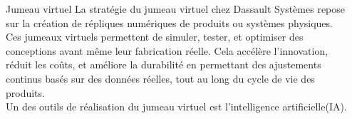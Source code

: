 \documentclass{ENSEIRB_poster}
\begin{document}
\begin{frame}[t]
\begin{columns}[t]
\begin{column}{\twocolwidth}
      \vspace{5pt}

      \begin{block}{Jumeau virtuel}
        La stratégie du jumeau virtuel chez Dassault Systèmes repose sur la création de répliques numériques de produits ou systèmes physiques. Ces jumeaux virtuels permettent de simuler, tester, et optimiser des conceptions avant même leur fabrication réelle. Cela accélère l'innovation, réduit les coûts, et améliore la durabilité en permettant des ajustements continus basés sur des données réelles, tout au long du cycle de vie des produits.\\
        Un des outils de réalisation du jumeau virtuel est l'intelligence artificielle(IA).
      \end{block}

    \end{column}

    \begin{column}{\sepwidth}\end{column}


\end{columns}
\end{frame}
\end{document}
